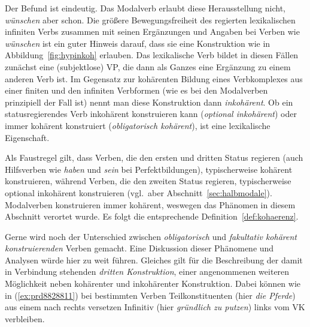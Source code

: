 \begin{exe}
  \ex\label{ex:prd9201} 
  \begin{xlist}
  \end{xlist}
\end{exe}

Der Befund ist eindeutig.
Das Modalverb erlaubt diese Herausstellung nicht, \textit{wünschen} aber schon.
Die größere Bewegungsfreiheit des regierten lexikalischen infiniten Verbs zusammen mit seinen Ergänzungen und Angaben bei Verben wie \textit{wünschen} ist ein guter Hinweis darauf, dass sie eine Konstruktion wie in Abbildung~\ref{fig:hypinkoh} erlauben.
Das lexikalische Verb bildet in diesen Fällen zunächst eine (subjektlose) VP, die dann als Ganzes eine Ergänzung zu einem anderen Verb ist.
Im Gegensatz zur kohärenten Bildung eines Verbkomplexes aus einer finiten und den infiniten Verbformen (wie es bei den Modalverben prinzipiell der Fall ist) nennt man diese Konstruktion dann \textit{inkohärent}.
Ob ein statusregierendes Verb inkohärent konstruieren kann (\textit{optional inkohärent}) oder immer kohärent konstruiert (\textit{obligatorisch kohärent}), ist eine lexikalische Eigenschaft.

Als Faustregel gilt, dass Verben, die den ersten und dritten Status regieren (\zB auch Hilfsverben wie \textit{haben} und \textit{sein} bei Perfektbildungen), typischerweise kohärent konstruieren, während Verben, die den zweiten Status regieren, typischerweise optional inkohärent konstruieren (vgl.\ aber \zB Abschnitt~\ref{sec:halbmodale}).
Modalverben konstruieren immer kohärent, weswegen das Phänomen in diesem Abschnitt verortet wurde.
Es folgt die entsprechende Definition~\ref{def:kohaerenz}.


Gerne wird noch der Unterschied zwischen \textit{obligatorisch} und \textit{fakultativ kohärent konstruierenden} Verben gemacht.
Eine Diskussion dieser Phänomene und Analysen würde hier zu weit führen.
Gleiches gilt für die Beschreibung der damit in Verbindung stehenden \textit{dritten Konstruktion}, einer angenommenen weiteren Möglichkeit neben kohärenter und inkohärenter Konstruktion.
Dabei können wie in (\ref{ex:prd8828811}) bei bestimmten Verben Teilkonstituenten (hier \textit{die Pferde}) aus einem nach rechts versetzen Infinitiv (hier \textit{gründlich zu putzen}) links vom VK verbleiben.

